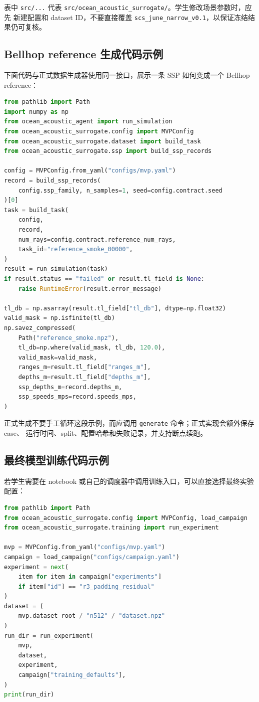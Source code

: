 \documentclass[UTF8,11pt]{ctexart}
\begin{document}
表中 \texttt{src/...} 代表 \texttt{src/ocean\_acoustic\_surrogate/}。学生修改场景参数时，应先
新建配置和 dataset ID，不要直接覆盖 \texttt{scs\_june\_narrow\_v0.1}，以保证冻结结果仍可复核。

\subsection{Bellhop reference 生成代码示例}

下面代码与正式数据生成器使用同一接口，展示一条 SSP 如何变成一个 Bellhop reference：

\begin{lstlisting}[style=repro,language=Python]
from pathlib import Path
import numpy as np
from ocean_acoustic_agent import run_simulation
from ocean_acoustic_surrogate.config import MVPConfig
from ocean_acoustic_surrogate.dataset import build_task
from ocean_acoustic_surrogate.ssp import build_ssp_records

config = MVPConfig.from_yaml("configs/mvp.yaml")
record = build_ssp_records(
    config.ssp_family, n_samples=1, seed=config.contract.seed
)[0]
task = build_task(
    config,
    record,
    num_rays=config.contract.reference_num_rays,
    task_id="reference_smoke_00000",
)
result = run_simulation(task)
if result.status == "failed" or result.tl_field is None:
    raise RuntimeError(result.error_message)

tl_db = np.asarray(result.tl_field["tl_db"], dtype=np.float32)
valid_mask = np.isfinite(tl_db)
np.savez_compressed(
    Path("reference_smoke.npz"),
    tl_db=np.where(valid_mask, tl_db, 120.0),
    valid_mask=valid_mask,
    ranges_m=result.tl_field["ranges_m"],
    depths_m=result.tl_field["depths_m"],
    ssp_depths_m=record.depths_m,
    ssp_speeds_mps=record.speeds_mps,
)
\end{lstlisting}

正式生成不要手工循环这段示例，而应调用 \texttt{generate} 命令；正式实现会额外保存 case、
运行时间、split、配置哈希和失败记录，并支持断点续跑。

\subsection{最终模型训练代码示例}

若学生需要在 notebook 或自己的调度器中调用训练入口，可以直接选择最终实验配置：

\begin{lstlisting}[style=repro,language=Python]
from pathlib import Path
from ocean_acoustic_surrogate.config import MVPConfig, load_campaign
from ocean_acoustic_surrogate.training import run_experiment

mvp = MVPConfig.from_yaml("configs/mvp.yaml")
campaign = load_campaign("configs/campaign.yaml")
experiment = next(
    item for item in campaign["experiments"]
    if item["id"] == "r3_padding_residual"
)
dataset = (
    mvp.dataset_root / "n512" / "dataset.npz"
)
run_dir = run_experiment(
    mvp,
    dataset,
    experiment,
    campaign["training_defaults"],
)
print(run_dir)
\end{lstlisting}
\end{document}
